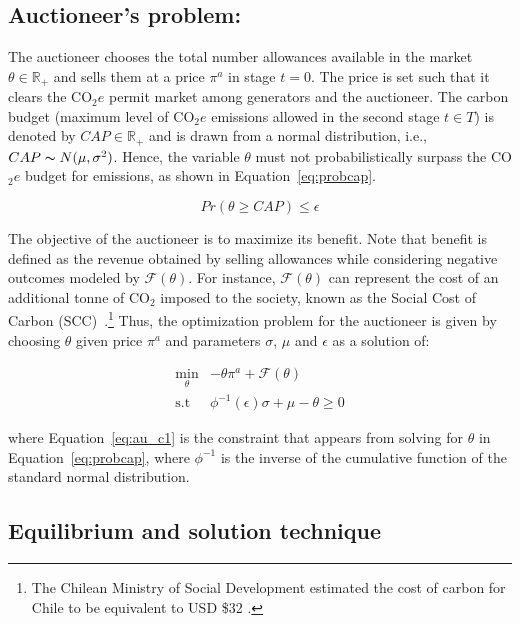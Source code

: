 \documentclass[11pt, letterpaper]{article}
\begin{document}
\subsection{Auctioneer's problem:}\label{sec:auctioneer}
 The auctioneer chooses the total number allowances available in the market $\theta\in \mathbb{R}_+$ and sells them at a price $\pi^a$ in stage $t=0$. The price is set such that it clears the CO$_2e$ permit market among generators and the auctioneer.  The carbon budget (maximum level of CO$_2e$ emissions allowed in the second stage $t\in T$) is denoted by  $CAP\in\mathbb{R}_+$ and is drawn from a normal distribution, i.e., $CAP \thicksim N(\mu, \sigma^2)$. Hence, the variable $\theta$ must not probabilistically surpass the CO$_2e$ budget for emissions, as shown in Equation~\ref{eq:probcap}.
 
\begin{equation}
    Pr(\theta \geq CAP) \leq \epsilon \label{eq:probcap}
\end{equation}

 The objective of the auctioneer is to maximize its benefit. Note that benefit is defined as the revenue obtained by selling allowances while considering negative outcomes modeled by $\mathcal{F}(\theta)$. For instance, $\mathcal{F}(\theta)$ can represent the cost of an additional tonne of CO$_2$ imposed to the society, known as the Social Cost of Carbon (SCC)~\cite{feijoo2014design}.\footnote{The Chilean Ministry of Social Development estimated the cost of carbon for Chile to be equivalent to USD \$32 \cite{ChileSCC}.} Thus, the optimization problem for the auctioneer is given by choosing $\theta$ given price $\pi^a$ and parameters $\sigma$, $\mu$ and $\epsilon$ as a solution of:

\begin{align}
    \min_{\theta} & -\theta \pi^{a}  + \mathcal{F}(\theta)   \label{eq:auc} \\
    \textrm{s.t \ } &  \phi^{-1}(\epsilon) \sigma + \mu - \theta  \geq 0 \label{eq:au_c1}
\end{align}

where Equation~\ref{eq:au_c1} is the constraint that appears from solving for $\theta$ in Equation~\ref{eq:probcap}, where $\phi^{-1}$ is the inverse of the cumulative function of the standard normal distribution. 

\subsection{Equilibrium and solution technique}\label{sec:equi}
\end{document}

